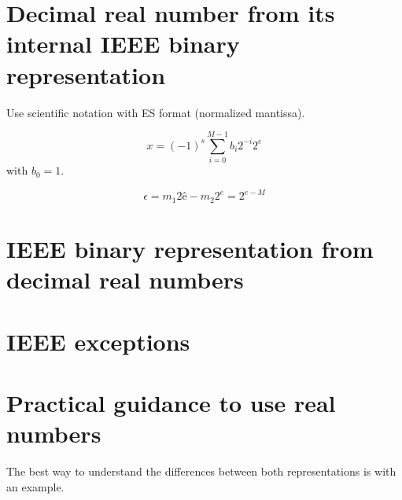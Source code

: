 

\section{Decimal real number from its internal IEEE binary representation}



Use scientific notation with ES format (normalized mantissa).

$$
   x = (-1) ^s \sum_{i=0}^{M-1}  b_i 2^{-i} 2^e 
$$
with $b_0 = 1$. 

$$
   \epsilon = m_1 2 ê - m_2 2^e  = 2^{e-M} 
$$


\section{IEEE binary representation from decimal real numbers}


\section{IEEE exceptions}





\section{Practical guidance to use real numbers} 


The best way to understand the differences between both representations is with an example. 









